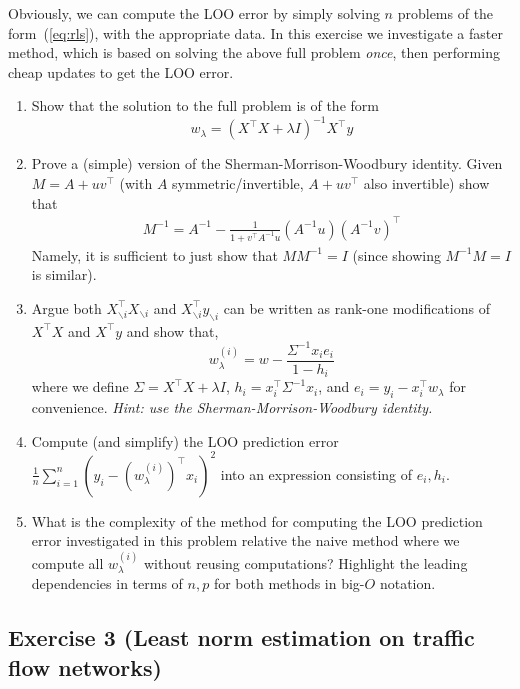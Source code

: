 \documentclass[11pt]{article}
\begin{document}
Obviously, we can compute the LOO error by simply solving $n$ problems of the form~(\ref{eq:rls}), with the appropriate data. In this exercise we investigate a faster method, which is based on solving the above full problem \emph{once}, then performing cheap updates to get the LOO error.

\begin{enumerate}
    \item Show that the solution to the full problem is of the form
    \[
    w_\lambda = (X^\top X+\lambda I)^{-1}X^\top y
    \]
    \item Prove a (simple) version of the Sherman-Morrison-Woodbury identity. Given $M=A+uv^\top$ (with $A$ symmetric/invertible, $A+uv^\top$ also invertible) show that
    \begin{align}
        M^{-1} = A^{-1}-\frac{1}{1+v^\top A^{-1} u} (A^{-1} u)(A^{-1} v)^\top
    \end{align}
    Namely, it is sufficient to just show that $MM^{-1}=I$ (since showing $M^{-1}M=I$ is similar).
    \item Argue both $X_{\backslash i}^\top X_{\backslash i}$ and $X_{\backslash i}^\top y_{\backslash i}$ can be written as rank-one modifications of $X^\top X$ and $X^\top y$ and show that,
    \[
    w^{(i)}_\lambda = w - \frac{\Sigma^{-1} x_i e_i}{1-h_i}
    \]
    where we define $\Sigma = X^\top X+\lambda I$, $h_i = x_i^\top \Sigma^{-1} x_i$, and $e_i = y_i - x_i^\top w_{\lambda}$ for convenience.
    {\em Hint: use the Sherman-Morrison-Woodbury identity.}

    \item Compute (and simplify) the LOO prediction error $\frac{1}{n} \sum_{i=1}^{n} (y_i-(w^{(i)}_{\lambda})^\top x_i)^2$ into an expression consisting of $e_i, h_i$.

    \item What is the complexity of the method for computing the LOO prediction error investigated in this problem relative the naive method where we compute all $w_{\lambda}^{(i)}$ without reusing computations? Highlight the leading dependencies in terms of $n, p$ for both methods in big-$O$ notation.
\end{enumerate}

\begin{solution}
\end{solution}


\newpage
\subsection*{Exercise 3 (Least norm estimation on traffic flow networks)}
\end{document}
